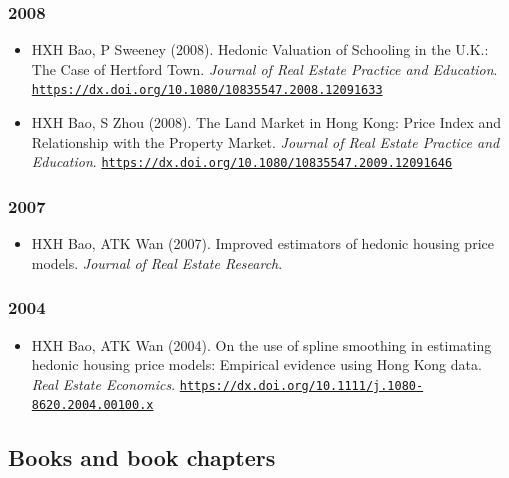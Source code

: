 \documentclass[11pt,a4paper]{article}
\providecommand{\tightlist}{%
  \setlength{\itemsep}{1pt}\setlength{\parskip}{0pt}}
\begin{document}
\subsubsection{2008}\label{section-16}

\begin{itemize}
\tightlist
\item
  HXH Bao, P Sweeney (2008). Hedonic Valuation of Schooling in the U.K.:
  The Case of Hertford Town. \emph{Journal of Real Estate Practice and
  Education}.
  \href{https://dx.doi.org/10.1080/10835547.2008.12091633}{\nolinkurl{https://dx.doi.org/10.1080/10835547.2008.12091633}}
\item
  HXH Bao, S Zhou (2008). The Land Market in Hong Kong: Price Index and
  Relationship with the Property Market. \emph{Journal of Real Estate
  Practice and Education}.
  \href{https://dx.doi.org/10.1080/10835547.2009.12091646}{\nolinkurl{https://dx.doi.org/10.1080/10835547.2009.12091646}}
\end{itemize}

\subsubsection{2007}\label{section-17}

\begin{itemize}
\tightlist
\item
  HXH Bao, ATK Wan (2007). Improved estimators of hedonic housing price
  models. \emph{Journal of Real Estate Research}.
\end{itemize}

\subsubsection{2004}\label{section-18}

\begin{itemize}
\tightlist
\item
  HXH Bao, ATK Wan (2004). On the use of spline smoothing in estimating
  hedonic housing price models: Empirical evidence using Hong Kong data.
  \emph{Real Estate Economics}.
  \href{https://dx.doi.org/10.1111/j.1080-8620.2004.00100.x}{\nolinkurl{https://dx.doi.org/10.1111/j.1080-8620.2004.00100.x}}
\end{itemize}

\subsection{Books and book chapters}\label{books-and-book-chapters}
\end{document}
